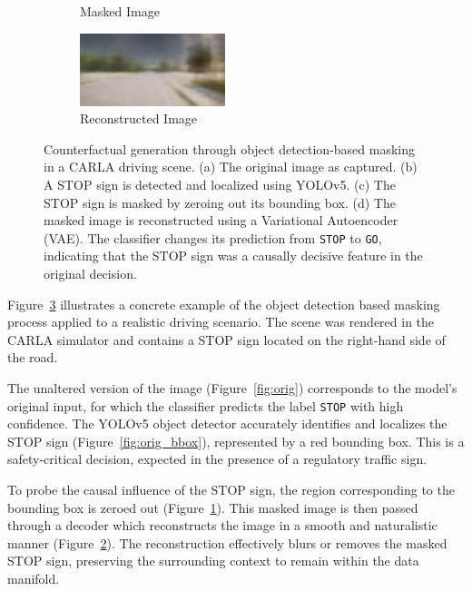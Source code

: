 \begin{figure}[htbp]
\begin{subfigure}[b]{0.24\textwidth}
    \caption{Masked Image}
    \label{fig:masked}
\end{subfigure}
\hfill
\begin{subfigure}[b]{0.24\textwidth}
    \includegraphics[width=\textwidth]{img/masking/object_detection/CE.png}
    \caption{Reconstructed Image}
    \label{fig:reconstructed}
\end{subfigure}
    \caption[Example of object detection-based counterfactual explanation]{%
    Counterfactual generation through object detection-based masking in a CARLA driving scene. (a) The original image as captured. (b) A STOP sign is detected and localized using YOLOv5. (c) The STOP sign is masked by zeroing out its bounding box. (d) The masked image is reconstructed using a Variational Autoencoder (VAE). The classifier changes its prediction from \texttt{STOP} to \texttt{GO}, indicating that the STOP sign was a causally decisive feature in the original decision.}
    \label{fig:object_detection_masking}
\end{figure}


Figure~\ref{fig:object_detection_masking} illustrates a concrete example of the object detection based masking process applied to a realistic driving scenario. The scene was rendered in the CARLA simulator and contains a STOP sign located on the right-hand side of the road.

The unaltered version of the image (Figure~\ref{fig:orig}) corresponds to the model's original input, for which the classifier predicts the label \texttt{STOP} with high confidence. The YOLOv5 object detector accurately identifies and localizes the STOP sign (Figure~\ref{fig:orig_bbox}), represented by a red bounding box. This is a safety-critical decision, expected in the presence of a regulatory traffic sign.

To probe the causal influence of the STOP sign, the region corresponding to the bounding box is zeroed out (Figure~\ref{fig:masked}). This masked image is then passed through a decoder which reconstructs the image in a smooth and naturalistic manner (Figure~\ref{fig:reconstructed}). The reconstruction effectively blurs or removes the masked STOP sign, preserving the surrounding context to remain within the data manifold.

